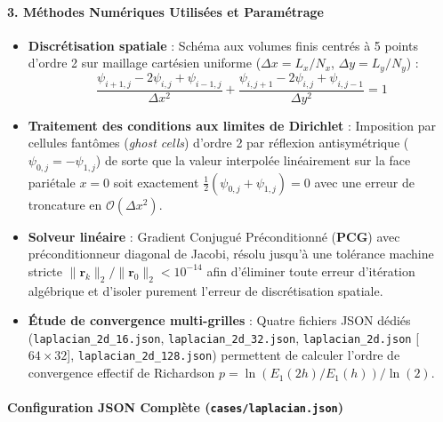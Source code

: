 \documentclass[
  10pt,
]{article}
\providecommand{\tightlist}{%
  \setlength{\itemsep}{0pt}\setlength{\parskip}{0pt}}
\begin{document}
\paragraph{3. Méthodes Numériques Utilisées et
Paramétrage}\label{muxe9thodes-numuxe9riques-utilisuxe9es-et-paramuxe9trage}

\begin{itemize}
\tightlist
\item
  \textbf{Discrétisation spatiale} : Schéma aux volumes finis centrés à
  5 points d'ordre 2 sur maillage cartésien uniforme
  (\(\Delta x = L_x / N_x\), \(\Delta y = L_y / N_y\)) :
  \[\frac{\psi_{i+1,j} - 2\psi_{i,j} + \psi_{i-1,j}}{\Delta x^2} + \frac{\psi_{i,j+1} - 2\psi_{i,j} + \psi_{i,j-1}}{\Delta y^2} = 1\]
\item
  \textbf{Traitement des conditions aux limites de Dirichlet} :
  Imposition par cellules fantômes (\emph{ghost cells}) d'ordre 2 par
  réflexion antisymétrique (\(\psi_{0,j} = -\psi_{1,j}\)) de sorte que
  la valeur interpolée linéairement sur la face pariétale \(x = 0\) soit
  exactement \(\frac{1}{2}(\psi_{0,j} + \psi_{1,j}) = 0\) avec une
  erreur de troncature en \(\mathcal{O}(\Delta x^2)\).
\item
  \textbf{Solveur linéaire} : Gradient Conjugué Préconditionné
  (\textbf{PCG}) avec préconditionneur diagonal de Jacobi, résolu
  jusqu'à une tolérance machine stricte
  \(\|\mathbf{r}_k\|_2 / \|\mathbf{r}_0\|_2 < 10^{-14}\) afin d'éliminer
  toute erreur d'itération algébrique et d'isoler purement l'erreur de
  discrétisation spatiale.
\item
  \textbf{Étude de convergence multi-grilles} : Quatre fichiers JSON
  dédiés (\texttt{laplacian\_2d\_16.json},
  \texttt{laplacian\_2d\_32.json}, \texttt{laplacian\_2d.json}
  {[}\(64\times 32\){]}, \texttt{laplacian\_2d\_128.json}) permettent de
  calculer l'ordre de convergence effectif de Richardson
  \(p = \ln(E_1(2h)/E_1(h))/\ln(2)\).
\end{itemize}

\paragraph{\texorpdfstring{Configuration JSON Complète
(\texttt{cases/laplacian.json})}{Configuration JSON Complète (cases/laplacian.json)}}\label{configuration-json-compluxe8te-caseslaplacian.json}
\end{document}
